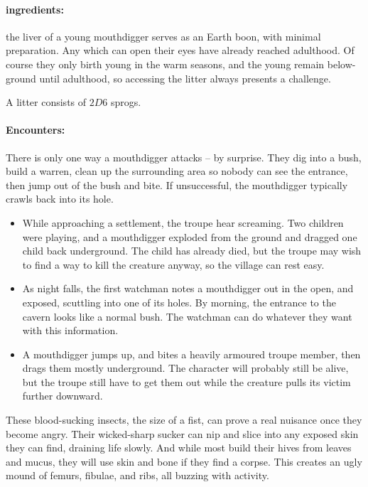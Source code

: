 \begin{multicols}{2}
\paragraph{\Glspl{ingredient}:}
the liver of a young mouthdigger serves as an Earth \gls{boon}, with minimal preparation.
Any which can open their eyes have already reached adulthood.
Of course they only birth young in the warm seasons, and the young remain below-ground until adulthood, so accessing the litter always presents a challenge.

A litter consists of $2D6$ sprogs.

\paragraph{Encounters:} There is only one way a mouthdigger attacks -- by surprise.  They dig into a bush, build a warren, clean up the surrounding area so nobody can see the entrance, then jump out of the bush and bite.  If unsuccessful, the mouthdigger typically crawls back into its hole.

\begin{itemize}

  \item
  While approaching a settlement, the troupe hear screaming.
  Two children were playing, and a mouthdigger exploded from the ground and dragged one child back underground.
  The child has already died, but the troupe may wish to find a way to kill the creature anyway, so the village can rest easy.
  \item
  As night falls, the first watchman notes a mouthdigger out in the open, and exposed, scuttling into one of its holes.
  By morning, the entrance to the cavern looks like a normal bush.
  The watchman can do whatever they want with this information.
  \item
  A mouthdigger jumps up, and bites a heavily armoured troupe member, then drags them mostly underground.
  The character will probably still be alive, but the troupe still have to get them out while the creature pulls its victim further downward.

\end{itemize}

\mouthdigger

\label{stirge}

These blood-sucking insects, the size of a fist, can prove a real nuisance once they become angry.
Their wicked-sharp sucker can nip and slice into any exposed skin they can find, draining life slowly.
And while most build their hives from leaves and mucus, they will use skin and bone if they find a corpse.
This creates an ugly mound of femurs, fibulae, and ribs, all buzzing with activity.


\end{multicols}

